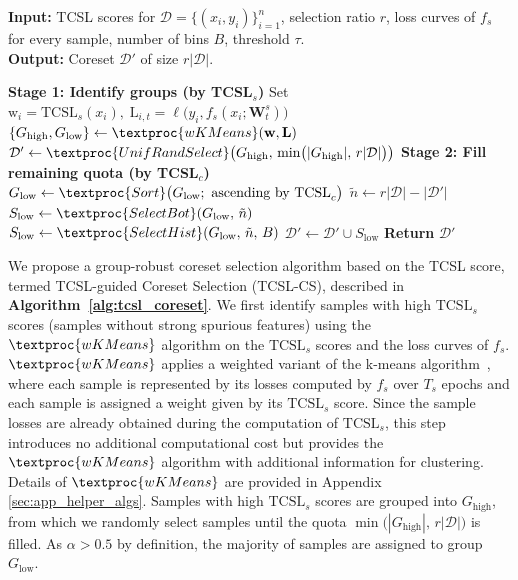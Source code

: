 \documentclass[letter,11pt]{article}
\begin{document}
\begin{algorithm}[t]
\caption{TCSL-guided Coreset Selection}
\label{alg:tcsl_coreset}
\textbf{Input:} TCSL scores for $\mathcal{D}=\{(x_i,y_i)\}_{i=1}^{n}$, selection ratio $r$, loss curves of $f_s$ for every sample, number of bins $B$, threshold $\tau$.\\
\textbf{Output:} Coreset $\mathcal{D}'$ of size $r|\mathcal{D}|$.
\begin{algorithmic}[1]
\State \textbf{Stage 1: Identify groups (by TCSL$_s$)}
\State Set $\mathrm{w}_i = \text{TCSL}_s(x_i), \;
\mathrm{L}_{i,t} = \ell\big(y_i, f_s(x_i;\mathbf{W}_t^s)\big)$
\State $\{G_{\text{high}}, G_{\text{low}}\} \gets \textproc{wKMeans}(\mathbf{w}, \mathbf{L})$
\State $\mathcal{D}' \gets \textproc{UnifRandSelect}\!\left(G_{\text{high}},\, \min\!\big(|G_{\text{high}}|,\, r|\mathcal{D}|\big)\right)$
\Statex
\State \textbf{Stage 2: Fill remaining quota (by TCSL$_c$)}
    \State $G_{\text{low}} \gets \textproc{Sort}\big(G_{\text{low}};\ \text{ascending by TCSL}_c\big)$
    \State $\tilde{n} \gets r|\mathcal{D}| - |\mathcal{D}'|$
        \State $S_{\text{low}} \gets \textproc{SelectBot}(G_{\text{low}},\, \tilde{n})$
    \Else
        \State $S_{\text{low}} \gets \textproc{SelectHist}(G_{\text{low}},\, \tilde{n},\, B)$
    \EndIf
    \State $\mathcal{D}' \gets \mathcal{D}' \cup S_{\text{low}}$
\EndIf
\State \textbf{Return} $\mathcal{D}'$
\end{algorithmic}
\end{algorithm}
\vspace{-3pt}
We propose a group-robust coreset selection algorithm based on the TCSL score, termed TCSL-guided Coreset Selection (TCSL-CS), described in \textbf{Algorithm~\ref{alg:tcsl_coreset}}. We first identify samples with high $\text{TCSL}_s$ scores (samples without strong spurious features) using the $\textproc{wKMeans}$ algorithm on the $\text{TCSL}_s$ scores and the loss curves of $f_s$. $\textproc{wKMeans}$ applies a weighted variant of the k-means algorithm~\citep{KMEANS}, where each sample is represented by its losses computed by $f_s$ over $T_s$ epochs and each sample is assigned a weight given by its $\text{TCSL}_s$ score. Since the sample losses are already obtained during the computation of $\text{TCSL}_s$, this step introduces no additional computational cost but provides the $\textproc{wKMeans}$ algorithm with additional information for clustering. Details of $\textproc{wKMeans}$ are provided in Appendix \ref{sec:app_helper_algs}. Samples with high $\text{TCSL}_s$ scores are grouped into $G_{\text{high}}$, from which we randomly select samples until the quota $\min\!\big(|G_{\text{high}}|,\,\!r|\mathcal{D}|\big)$ is filled. As $\alpha\!>\!0.5$ by definition, the majority of samples are assigned to group $G_{\text{low}}$.
\end{document}
